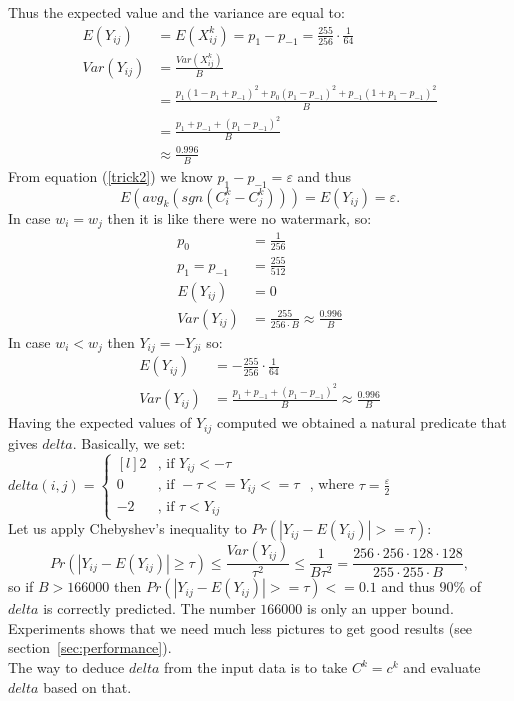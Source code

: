 \documentclass[a4paper,12pt]{article}
\begin{document}
Thus the expected value and the variance are equal to:
\begin{align*}
E(Y_{ij}) &= E(X^k_{ij}) = p_1 - p_{-1}=\frac{255}{256}\cdot \frac{1}{64}\\
Var(Y_{ij}) &= \frac{Var(X^k_{ij})}{B}\\
            &= \frac{p_1(1-p_1+p_{-1})^2 + p_0(p_1-p_{-1})^2 + p_{-1}(1+p_1-p_{-1})^2}{B}\\
            &= \frac{p_1 + p_{-1} + (p_1-p_{-1})^2}{B}\\
            &\approx \frac{0.996}{B}
\end{align*}
From equation (\ref{trick2}) we know $p_1 - p_{-1} = \varepsilon$ and thus
\begin{equation}
\label{eq:avg:eps}
E(avg_k(sgn(C^k_i-C^k_j))) = E(Y_{ij}) = \varepsilon.
\end{equation}
In case $w_i = w_j$ then it is like there were no watermark, so:\\
\begin{align*}
p_0 &= \frac{1}{256}\\
p_1 = p_{-1} &= \frac{255}{512}\\
E(Y_{ij}) &= 0\\
Var(Y_{ij}) &= \frac{255}{256\cdot B} \approx \frac{0.996}{B}
\end{align*}
In case $w_i < w_j$ then $Y_{ij} = -Y_{ji}$ so:\\
\begin{align*}
E(Y_{ij}) &= -\frac{255}{256}\cdot \frac{1}{64}\\
Var(Y_{ij}) &= \frac{p_1 + p_{-1} + (p_1-p_{-1})^2}{B} \approx \frac{0.996}{B}
\end{align*}
Having the expected values of $Y_{ij}$ computed we obtained a natural predicate
that gives $delta$. Basically, we set:\\
$delta(i, j) = \left\{
  \begin{matrix*}[l]
    2&\text{, if } Y_{ij} < -\tau\\
    0&\text{, if } -\tau <= Y_{ij} <= \tau\\
    -2&\text{, if } \tau < Y_{ij}
  \end{matrix*}\right.$ , where $\tau = \frac{\varepsilon}{2}$\\
Let us apply Chebyshev's inequality to $Pr(|Y_{ij} - E(Y_{ij})| >= \tau)$:
$$
Pr(|Y_{ij} - E(Y_{ij})| \geq \tau)
  \leq \frac{Var(Y_{ij})}{\tau^2}
  \leq \frac{1}{B\tau^2}
  = \frac{256\cdot 256\cdot 128\cdot 128}{255\cdot 255\cdot B},
$$
so if $B > 166000$ then $Pr(|Y_{ij} - E(Y_{ij})| >= \tau) <= 0.1$ and thus
$90$\% of $delta$ is correctly predicted. The number $166000$ is only an upper bound. Experiments shows
that we need much less pictures to get good results (see section~\ref{sec:performance}).\\
The way to deduce $delta$ from the input data is to take $C^k = c^k$ and
evaluate $delta$ based on that.
\end{document}
